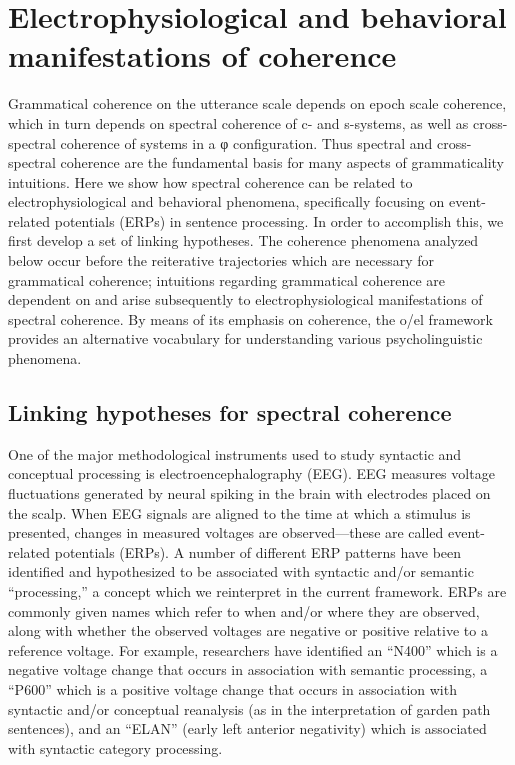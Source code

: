 \section{Electrophysiological and behavioral manifestations of coherence}

Grammatical coherence on the utterance scale depends on epoch scale coherence, which in turn depends on spectral coherence of c- and s-systems, as well as cross-spectral coherence of systems in a φ configuration. Thus spectral and cross-spectral coherence are the fundamental basis for many aspects of grammaticality intuitions. Here we show how spectral coherence can be related to electrophysiological and behavioral phenomena, specifically focusing on event-related potentials (ERPs) in sentence processing. In order to accomplish this, we first develop a set of linking hypotheses. The coherence phenomena analyzed below occur before the reiterative trajectories which are necessary for grammatical coherence; intuitions regarding grammatical coherence are dependent on and arise subsequently to electrophysiological manifestations of spectral coherence. By means of its emphasis on coherence, the o/el framework provides an alternative vocabulary for understanding various psycholinguistic phenomena.

\subsection{Linking hypotheses for spectral coherence}

One of the major methodological instruments used to study syntactic and conceptual processing is electroencephalography (EEG). EEG measures voltage fluctuations generated by neural spiking in the brain with electrodes placed on the scalp. When EEG signals are aligned to the time at which a stimulus is presented, changes in measured voltages are observed—these are called event-related potentials (ERPs). A number of different ERP patterns have been identified and hypothesized to be associated with syntactic and/or semantic “processing,” a concept which we reinterpret in the current framework. ERPs are commonly given names which refer to when and/or where they are observed, along with whether the observed voltages are negative or positive relative to a reference voltage. For example, researchers have identified an “N400” which is a negative voltage change that occurs in association with semantic processing, a “P600” which is a positive voltage change that occurs in association with syntactic and/or conceptual reanalysis (as in the interpretation of garden path sentences), and an “ELAN” (early left anterior negativity) which is associated with syntactic category processing. 


